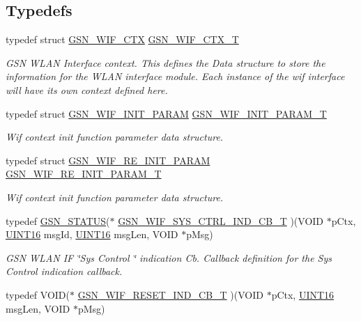 \subsection*{Typedefs}
\begin{DoxyCompactItemize}
\item 
typedef struct \hyperlink{a00323}{GSN\_\-WIF\_\-CTX} \hyperlink{a00635_ga7a8bd94a4326b0ff61696008eda89228}{GSN\_\-WIF\_\-CTX\_\-T}
\begin{DoxyCompactList}\small\item\em GSN WLAN Interface context. This defines the Data structure to store the information for the WLAN interface module. Each instance of the wif interface will have its own context defined here. \end{DoxyCompactList}\item 
typedef struct \hyperlink{a00338}{GSN\_\-WIF\_\-INIT\_\-PARAM} \hyperlink{a00635_gaf24820ac43e65f03340551f2b579f6f5}{GSN\_\-WIF\_\-INIT\_\-PARAM\_\-T}
\begin{DoxyCompactList}\small\item\em Wif context init function parameter data structure. \end{DoxyCompactList}\item 
typedef struct \hyperlink{a00342}{GSN\_\-WIF\_\-RE\_\-INIT\_\-PARAM} \hyperlink{a00635_ga3af1a4583d80b21b8aa4274a01ca7ad7}{GSN\_\-WIF\_\-RE\_\-INIT\_\-PARAM\_\-T}
\begin{DoxyCompactList}\small\item\em Wif context init function parameter data structure. \end{DoxyCompactList}\item 
typedef \hyperlink{a00660_gada5951904ac6110b1fa95e51a9ddc217}{GSN\_\-STATUS}($\ast$ \hyperlink{a00635_ga6079bd2ef0b375f3d1b987c9e3de8f6b}{GSN\_\-WIF\_\-SYS\_\-CTRL\_\-IND\_\-CB\_\-T} )(VOID $\ast$pCtx, \hyperlink{a00660_ga09f1a1fb2293e33483cc8d44aefb1eb1}{UINT16} msgId, \hyperlink{a00660_ga09f1a1fb2293e33483cc8d44aefb1eb1}{UINT16} msgLen, VOID $\ast$pMsg)
\begin{DoxyCompactList}\small\item\em GSN WLAN IF \char`\"{}Sys Control \char`\"{} indication Cb. Callback definition for the Sys Control indication callback. \end{DoxyCompactList}\item 
typedef VOID($\ast$ \hyperlink{a00635_gad71afa8e03b517ec379abfa3cb39de92}{GSN\_\-WIF\_\-RESET\_\-IND\_\-CB\_\-T} )(VOID $\ast$pCtx, \hyperlink{a00660_ga09f1a1fb2293e33483cc8d44aefb1eb1}{UINT16} msgLen, VOID $\ast$pMsg)

\end{DoxyCompactItemize}
